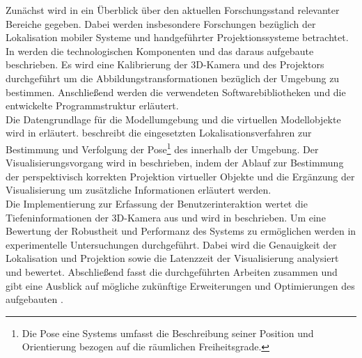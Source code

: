 Zunächst wird in  ein Überblick über den aktuellen Forschungsstand relevanter Bereiche gegeben. Dabei werden insbesondere Forschungen bezüglich der Lokalisation mobiler Systeme und handgeführter Projektionssysteme betrachtet. In  werden die technologischen Komponenten und das daraus aufgebaute \kps{} beschrieben. Es wird eine Kalibrierung der 3D-Kamera und des Projektors durchgeführt um die Abbildungstransformationen bezüglich der Umgebung zu bestimmen. Anschließend werden die verwendeten Softwarebibliotheken und die entwickelte Programmstruktur erläutert.\\
Die Datengrundlage für die Modellumgebung und die virtuellen Modellobjekte wird in  erläutert.  beschreibt die eingesetzten Lokalisationsverfahren zur Bestimmung und Verfolgung der Pose\footnote{Die Pose eine Systems umfasst die Beschreibung seiner Position und Orientierung bezogen auf die räumlichen Freiheitsgrade.
\prever{
}
}
 des  innerhalb der Umgebung. Der Visualisierungsvorgang wird in  beschrieben, indem der Ablauf zur Bestimmung der perspektivisch korrekten Projektion virtueller Objekte und die Ergänzung der Visualisierung um zusätzliche Informationen erläutert werden.\\
Die Implementierung zur Erfassung der Benutzerinteraktion wertet die Tiefeninformationen der 3D-Kamera aus und wird in  beschrieben. Um eine Bewertung der Robustheit und Performanz des Systems zu ermöglichen werden in  experimentelle Untersuchungen durchgeführt. Dabei wird die Genauigkeit der Lokalisation und Projektion sowie die Latenzzeit der Visualisierung analysiert und bewertet. Abschließend fasst  die durchgeführten Arbeiten zusammen und gibt eine Ausblick auf mögliche zukünftige Erweiterungen und Optimierungen des aufgebauten .

